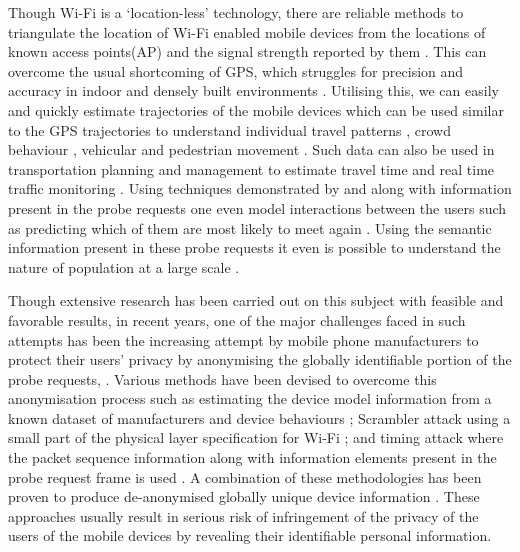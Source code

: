 Though Wi-Fi is a `location-less' technology, there are reliable methods to triangulate the location of Wi-Fi enabled mobile devices from the locations of known access points(AP) and the signal strength reported by them \citep{he2003range, moore2004robust, lamarca2005place}.
This can overcome the usual shortcoming of GPS, which struggles for precision and accuracy in indoor and densely built environments \citep{zarim2006,kawaguchi2009wifi, xi2010locating}. 
Utilising this, we can easily and quickly estimate trajectories of the mobile devices \citep{Sorensenlocation,musa2012tracking} which can be used similar to the GPS trajectories to understand individual travel patterns \citep{reki2007,Sap2015}, crowd behaviour \citep{abedi2013bluetooth,mowafi2013tracking}, vehicular \citep{lu2010vehicle} and pedestrian movement \citep{xu2013pedestrian,fukuzaki2014pedestrian,wang2016gait}.
Such data can also be used in transportation planning and management to estimate travel time \citep{musa2011wiflow} and real time traffic monitoring \citep{abbott2013empirical}.
Using techniques demonstrated by \cite{franklin2006passive} and \cite{pang2007802} along with information present in the probe requests one even model interactions between the users \citep{cheng2012inferring,barbera2013signals,cunche2014know,cunche2014linking} such as predicting which of them are most likely to meet again \citep{cunche2012know}.
Using the semantic information present in these probe requests it even is possible to understand the nature of population at a large scale \citep{di2016mind}. 

Though extensive research has been carried out on this subject with feasible and favorable results, in recent years, one of the major challenges faced in such attempts has been the increasing attempt by mobile phone manufacturers to protect their users’ privacy by anonymising the globally identifiable portion of the probe requests, \citep{green2008}.
Various methods have been devised to overcome this anonymisation process such as estimating the device model information from a known dataset of manufacturers and device behaviours \citep{martin2016decomposition}; Scrambler attack using a small part of the physical layer specification for Wi-Fi \citep{vo2016,bloessl2015scrambler}; and timing attack where the packet sequence information along with information elements present in the probe request frame is used \citep{matte2016,cheng2016can}.
A combination of these methodologies has been proven to produce de-anonymised globally unique device information \citep{vanhoef2016, martin2017}.
These approaches usually result in serious risk of infringement of the privacy of the users of the mobile devices by revealing their identifiable personal information.

